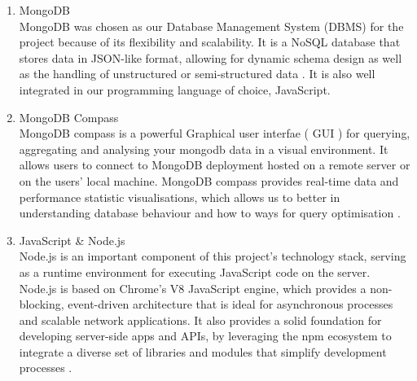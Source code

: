 \documentclass[a4paper,12pt]{article}  %
\begin{document}
\begin{enumerate}
      \item MongoDB\\ MongoDB was chosen as our Database Management System (DBMS) for the
            project because of its flexibility and scalability. It is a NoSQL database that
            stores data in JSON-like format, allowing for dynamic schema design as well as
            the handling of unstructured or semi-structured data \cite{mongodb}. It is also
            well integrated in our programming language of choice, JavaScript.\\

      \item MongoDB Compass\\ MongoDB compass is a powerful Graphical user interfae ( GUI )
            for querying, aggregating and analysing your mongodb data in a visual
            environment. It allows users to connect to MongoDB deployment hosted on a
            remote server or on the users’ local machine. MongoDB compass provides
            real-time data and performance statistic visualisations, which allows us to
            better in understanding database behaviour and how to ways for query
            optimisation \cite{mongodb_compass}.\\

      \item JavaScript \& Node.js\\ Node.js is an important component of this project's
            technology stack, serving as a runtime environment for executing JavaScript
            code on the server. Node.js is based on Chrome's V8 JavaScript engine, which
            provides a non-blocking, event-driven architecture that is ideal for
            asynchronous processes and scalable network applications. It also provides a
            solid foundation for developing server-side apps and APIs, by leveraging the
            npm ecosystem to integrate a diverse set of libraries and modules that simplify
            development processes \cite{nodejs2024} \cite{geeksforgeeks2024}
            \cite{w3schools2024}.\\


\end{enumerate}
\end{document}
